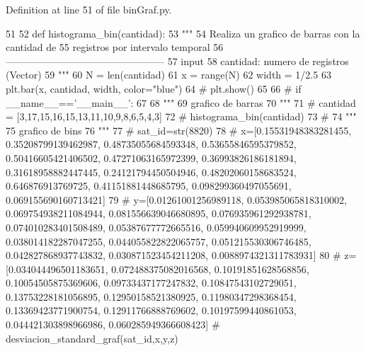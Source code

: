 \-Definition at line 51 of file bin\-Graf.\-py.


\begin{DoxyCode}
51 
52 def histograma_bin(cantidad):
53     """
54     Realiza un grafico de barras con la cantidad de
55     registros por intervalo temporal
56     ------------------------------------------------
57     input
58         cantidad: numero de registros (Vector)
59     """
60     N = len(cantidad)
61     x = range(N)
62     width = 1/2.5
63     plt.bar(x, cantidad, width, color="blue")
64 #    plt.show()
65     
66 # if __name__=='__main__':
67 
68     """
69     grafico de barras
70     """
71 #     cantidad = [3,17,15,16,15,13,11,10,9,8,6,5,4,3]
72 #     histograma_bin(cantidad)
73 #     
74     """
75     grafico de bins
76     """
77 #     sat_id=str(8820)
78 #     x=[0.15531948383281455, 0.35208799139462987, 0.48735055684593348,
       0.53655846595379852, 0.50416605421406502, 0.47271063165972399, 0.36993826186181894,
       0.31618958882447445, 0.24121794450504946, 0.48202060158683524, 0.646876913769725,
       0.41151881448685795, 0.098299360497055691, 0.069155690160713421]
79 #     y=[0.01261001256989118, 0.053985065818310002, 0.069754938211084944,
       0.081556639046680895, 0.076935961292938781, 0.074010283401508489,
       0.05387677772665516, 0.059940609952919999, 0.038014182287047255, 0.044055822822065757,
       0.051215530306746485, 0.042827868937743832, 0.030871523454211208, 0.0088974321311783931]
80 #     z=[0.034044496501183651, 0.072488375082016568, 0.10191851628568856,
       0.10054505875369606, 0.09733437177247832, 0.10847543102729051, 0.13753228181056895,
       0.12950158521380925, 0.11980347298368454, 0.13369423771900754,
       0.12911766888769602, 0.10197599440861053, 0.044421303898966986, 0.060285949366608423]
#     desviacion_standard_graf(sat_id,x,y,z)\end{DoxyCode}
